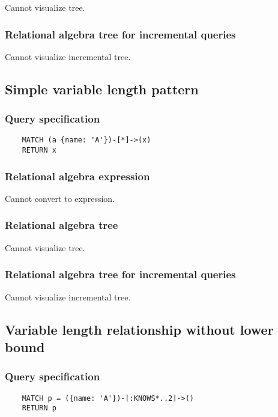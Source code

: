 	Cannot visualize tree.

	\subsubsection*{Relational algebra tree for incremental queries}

	Cannot visualize incremental tree.
	\subsection{Simple variable length pattern}

	\subsubsection*{Query specification}

	\begin{lstlisting}
	MATCH (a {name: 'A'})-[*]->(x)
	RETURN x
	\end{lstlisting}


	\subsubsection*{Relational algebra expression}

	Cannot convert to expression.

	\subsubsection*{Relational algebra tree}

	Cannot visualize tree.

	\subsubsection*{Relational algebra tree for incremental queries}

	Cannot visualize incremental tree.
	\subsection{Variable length relationship without lower bound}

	\subsubsection*{Query specification}

	\begin{lstlisting}
	MATCH p = ({name: 'A'})-[:KNOWS*..2]->()
	RETURN p
	\end{lstlisting}


